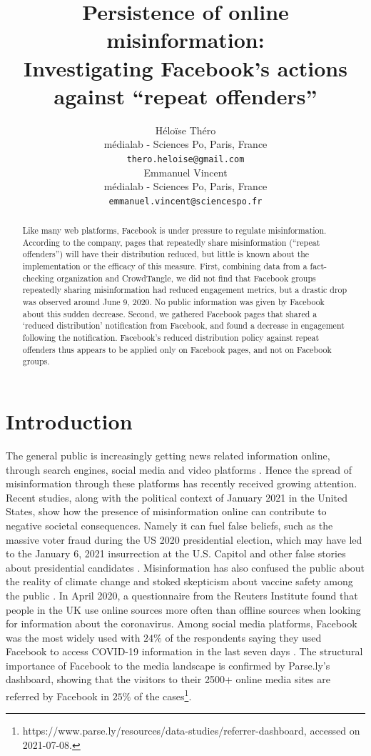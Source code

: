 \documentclass[11pt,a4paper]{article}
\title{Persistence of online misinformation: \\ Investigating Facebook's actions against ``repeat offenders''}
\author{Héloïse Théro \\
  médialab - Sciences Po, Paris, France \\
  \texttt{thero.heloise@gmail.com} \\\And
  Emmanuel Vincent \\
  médialab - Sciences Po, Paris, France \\
  \texttt{emmanuel.vincent@sciencespo.fr} \\}
\date{}
\begin{document}
\maketitle

\begin{abstract}
Like many web platforms, Facebook is under pressure to regulate misinformation. 
According to the company, pages that repeatedly share misinformation (“repeat offenders”) will have their distribution reduced, but little is known about the implementation or the efficacy of this measure.
First, combining data from a fact-checking organization and CrowdTangle, we did not find that Facebook groups repeatedly sharing misinformation had reduced engagement metrics, but a drastic drop was observed around June 9, 2020.
No public information was given by Facebook about this sudden decrease.
Second, we gathered Facebook pages that shared a `reduced distribution' notification from Facebook, and found a decrease in engagement following the notification.
Facebook’s reduced distribution policy against repeat offenders thus appears to be applied only on Facebook pages, and not on Facebook groups.
\end{abstract}

\section{Introduction}

The general public is increasingly getting news related information online, through search engines, social media and video platforms \citep{mitchell2016modern}.
Hence the spread of misinformation through these platforms has recently received growing attention.
Recent studies, along with the political context of January 2021 in the United States, show how the presence of misinformation online can contribute to negative societal consequences.
Namely it can fuel false beliefs, such as the massive voter fraud during the US 2020 presidential election, which may have led to the January 6, 2021 insurrection at the U.S. Capitol \citep{benkler2020mail} and other false stories about presidential candidates \citep{allcott2017social}. 
Misinformation has also confused the public about the reality of climate change \citep{brulle30years, porter2019can} and stoked skepticism about vaccine safety among the public \citep{featherstone2020feeling, lahouati2020spread}. 
In April 2020, a questionnaire from the Reuters Institute found that people in the UK use online sources more often than offline sources when looking for information about the coronavirus. 
Among social media platforms, Facebook was the most widely used with $24\%$ of the respondents saying they used Facebook to access COVID-19 information in the last seven days \citep{fletcher2020information}. 
The structural importance of Facebook to the media landscape is confirmed by Parse.ly’s dashboard, showing that the visitors to their 2500+ online media sites are referred by Facebook in $25\%$ of the cases\footnote{https://www.parse.ly/resources/data-studies/referrer-dashboard, accessed on 2021-07-08.}.
\end{document}
